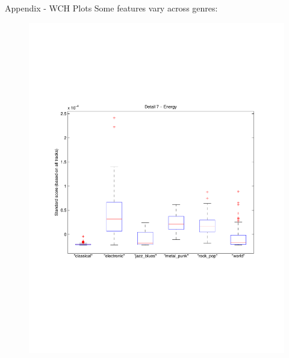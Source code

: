 \documentclass[xcolor=dvipsnames,t]{beamer} %
\begin{document}
\begin{frame}{Appendix - WCH Plots}
   Some features vary across genres:
   ~\\[-9em]
   \begin{figure}
      \centering
      \includegraphics[width=\textwidth]{figures/wch_box_16.pdf}
   \end{figure}
\end{frame}
\end{document}
